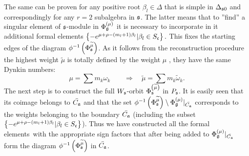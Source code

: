 The same can be proven for any positive root $\beta _{l}\in \Delta $ that is
simple in $\Delta _{\frak{s}0}$ and correspondingly for any $r=2$ subalgebra
in $\frak{s}$. The latter means that to ''find'' a singular element of $%
\frak{s}$-module in $\Phi _{\frak{g}}^{\left( \mu \right) }$ it is necessary
to incorporate in it additional formal elements $\left\{ -e^{\mu +\rho
-\left( m_{l}+1\right) \beta _{l}}|\beta _{l}\in S_{\frak{c}}\right\}.$ This
fixes the starting edges of the diagram $\phi ^{-1}\left( \Phi _{\frak{s}}^{%
\widetilde{\mu }}\right) $. As it follows from the reconstruction procedure
the highest weight $\widetilde{\mu }$ is totally defined by the weight $\mu $%
, they have the same Dynkin numbers:
\begin{equation}
\mu =\sum m_{k}\omega _{k}\qquad \Longrightarrow \quad \widetilde{\mu }=\sum
m_{k}\widetilde{\omega }_{k} . \label{new h weight}
\end{equation}
The next step is to construct the full $W_{\frak{s}}$-orbit $\Phi _{\frak{s}%
}^{\left( \widetilde{\mu }\right) }$  in $P_{\frak{s}}$. It is easily seen
that its coimage belongs to $\bar{C_{\frak{a}}}$ and that the set $\phi
^{-1}\left( \Phi _{\frak{s}}^{\widetilde{\mu }}\right) \setminus \Phi _{%
\frak{g}}^{\left( \mu \right) }|_{\bar{C_{\frak{a}}}}$ corresponds to the
weights belonging to the boundary $\bar{C_{\frak{a}}}$ (including the subset
$\left\{ -e^{\mu +\rho -\left( m_{l}+1\right) \beta _{l}}|\beta _{l}\in S_{%
\frak{c}}\right\} $). Thus we have constructed all the formal elements\ with
the appropriate sign factors that after being added to $\Phi _{\frak{g}%
}^{\left( \mu \right) }|_{\bar{C_{\frak{a}}}}$ form the diagram $\phi
^{-1}\left( \Phi _{\frak{s}}^{\widetilde{\mu }}\right) $ in $\bar{C_{\frak{a}%
}}$.

